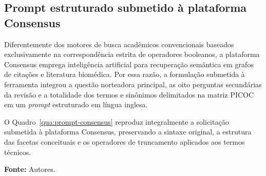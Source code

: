 \begin{center}
\end{center}

\subsection{Prompt estruturado submetido à plataforma Consensus}
\label{subsec:prompt-consensus}

Diferentemente dos motores de busca acadêmicos convencionais baseados exclusivamente na correspondência estrita de operadores booleanos, a plataforma Consensus emprega inteligência artificial para recuperação semântica em grafos de citações e literatura biomédica. Por essa razão, a formulação submetida à ferramenta integrou a questão norteadora principal, as oito perguntas secundárias da revisão e a totalidade dos termos e sinônimos delimitados na matriz PICOC em um \textit{prompt} estruturado em língua inglesa.

O Quadro~\ref{qua:prompt-consensus} reproduz integralmente a solicitação submetida à plataforma Consensus, preservando a sintaxe original, a estrutura das facetas conceituais e os operadores de truncamento aplicados aos termos técnicos.


\vspace{-0.2cm}\noindent\footnotesize\textbf{Fonte:} Autores.\vspace{0.4cm}

